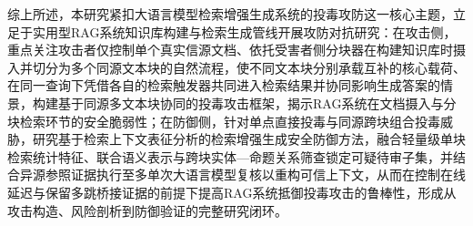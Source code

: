 综上所述，本研究紧扣大语言模型检索增强生成系统的投毒攻防这一核心主题，立足于实用型RAG系统知识库构建与检索生成管线开展攻防对抗研究：在攻击侧，重点关注攻击者仅控制单个真实信源文档、依托受害者侧分块器在构建知识库时摄入并切分为多个同源文本块的自然流程，使不同文本块分别承载互补的核心载荷、在同一查询下凭借各自的检索触发器共同进入检索结果并协同影响生成答案的情景，构建基于同源多文本块协同的投毒攻击框架，揭示RAG系统在文档摄入与分块检索环节的安全脆弱性；在防御侧，针对单点直接投毒与同源跨块组合投毒威胁，研究基于检索上下文表征分析的检索增强生成安全防御方法，融合轻量级单块检索统计特征、联合语义表示与跨块实体—命题关系筛查锁定可疑待审子集，并结合异源参照证据执行至多单次大语言模型复核以重构可信上下文，从而在控制在线延迟与保留多跳桥接证据的前提下提高RAG系统抵御投毒攻击的鲁棒性，形成从攻击构造、风险剖析到防御验证的完整研究闭环。
